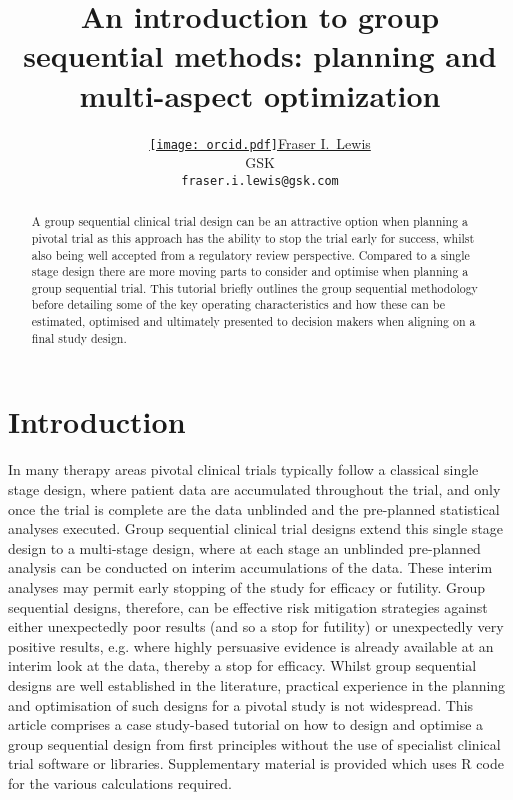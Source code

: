 \documentclass{article}
\title{An introduction to group sequential methods: planning and multi-aspect optimization}
\author{ \href{https://orcid.org/0000-0003-4580-2712}{\texttt{[image: orcid.pdf]}\hspace{1mm}Fraser I.~Lewis}
\\GSK\\
	\texttt{fraser.i.lewis@gsk.com} 
}
\begin{document}
\maketitle

\begin{abstract}
A group sequential clinical trial design can be an attractive option when planning a pivotal trial as this approach has the ability to stop the trial early for success, whilst also being well accepted from a regulatory review perspective. Compared to a single stage design there are more moving parts to consider and optimise when planning a group sequential trial. This tutorial briefly outlines the group sequential methodology before detailing some of the key operating characteristics and how these can be estimated, optimised and ultimately presented to decision makers when aligning on a final study design.   
\end{abstract}



\section{Introduction}\label{sec1}
In many therapy areas pivotal clinical trials typically follow a classical single stage design, where patient data are accumulated throughout the trial, and only once the trial is complete are the data unblinded and the pre-planned statistical analyses executed. Group sequential clinical trial designs extend this single stage design to a multi-stage design, where at each stage an unblinded pre-planned analysis can be conducted on interim accumulations of the data. These interim analyses may permit early stopping of the study for efficacy or futility. Group sequential designs, therefore, can be effective risk mitigation strategies against either unexpectedly poor results (and so a stop for futility) or unexpectedly very positive results, e.g. where highly persuasive evidence is already available at an interim look at the data, thereby a stop for efficacy. Whilst group sequential designs are well established in the literature, practical experience in the planning and optimisation of such designs for a pivotal study is not widespread. This article comprises a case study-based tutorial on how to design and optimise a group sequential design from first principles without the use of specialist clinical trial software or libraries. Supplementary material is provided which uses R code for the various calculations required. 
\end{document}

